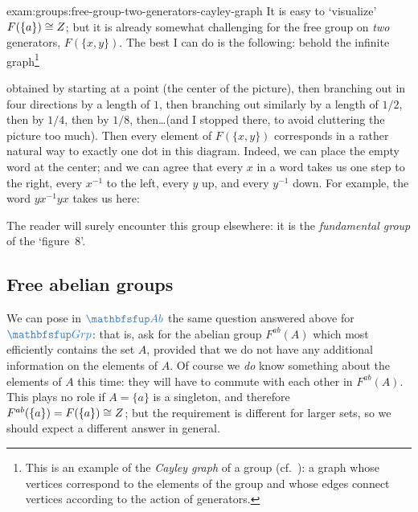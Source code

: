 \begin{exam}{}{exam:groups:free-group-two-generators-cayley-graph}
  It is easy to `visualize' $F(\{a\}) \cong Z$; but it is already
  somewhat challenging for the free group on \emph{two} generators,
  $F(\{x,y\})$. The best I can do is the following: behold the
  infinite graph\footnote{This is an example of the \emph{Cayley
      graph} of a group (cf.\
    ): a graph whose
    vertices correspond to the elements of the group and whose edges
    connect vertices according to the action of generators.}


  obtained by starting at a point (the center of the picture), then
  branching out in four directions by a length of $1$, then branching
  out similarly by a length of $1/2$, then by $1/4$, then by $1/8$,
  then\dots (and I stopped there, to avoid cluttering the picture too
  much). Then every element of $F(\{x,y\})$ corresponds in a rather
  natural way to exactly one dot in this diagram. Indeed, we can place
  the empty word at the center; and we can agree that every $x$ in a
  word takes us one step to the right, every $x^{-1}$ to the left,
  every $y$ up, and every $y^{-1}$ down. For example, the word
  $yx^{-1}yx$ takes us here:


  The reader will surely encounter this group elsewhere: it is the
  \emph{fundamental group} of the `figure~8'.
\end{exam}

\subsection{Free abelian groups}
\label{subsec:groups:free-abelian-groups}
We can pose in $\categ{Ab}$ the same question answered above for
$\categ{Grp}$: that is, ask for the abelian group $F^{ab}(A)$ which
most efficiently contains the set $A$, provided that we do not have
any additional information on the elements of $A$. Of course we
\emph{do} know something about the elements of $A$ this time: they
will have to commute with each other in $F^{ab}(A)$. This plays no
role if $A = \{a\}$ is a singleton, and therefore
$F^{ab}(\{a\}) = F(\{a\}) \cong Z$; but the requirement is different
for larger sets, so we should expect a different answer in general.


